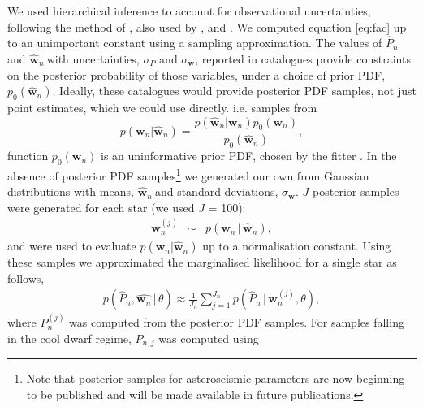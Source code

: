 \documentclass[11pt,preprint]{aastex}
\newcommand{\logg}{log \emph{g}}
\newcommand{\teff}{$T_{\rm{eff}}$}
\newcommand{\w}{\mathbf{w}}
\newcommand{\wh}{$\hat{\mathbf{w}}_n$}
\newcommand{\ph}{$\hat{P}_n$}
\newcommand{\feh}{[Fe/H]}
\begin{document}
We used hierarchical inference to account for observational uncertainties,
following the method of \citet{Hogg2010}, also used by
\citet{Foreman-Mackey2014}, \citet{Rogers2014} and \citet{Morton2014}.
We computed equation \ref{eq:fac} up to an unimportant constant
using a sampling approximation.
The values of \ph$~$and \wh$~$with uncertainties, $\sigma_P$ and
$\sigma_{\mathbf{w}}$, reported in catalogues provide constraints on the
posterior probability of those variables, under a choice of prior PDF,
$p_0(\hat{\mathbf{w}}_n)$.
Ideally, these catalogues would provide posterior PDF samples, not just point
estimates, which we could use directly.
i.e. samples from
\begin{equation}
	p(\mathbf{w}_n|\hat{\mathbf{w}}_n) =
	\frac{p(\hat{\mathbf{w}}_n|\mathbf{w}_n)p_0(\mathbf{w}_n)}
	{p_0(\hat{\mathbf{w}}_n)},
\end{equation}
function $p_0(\mathbf{w}_n)$ is an uninformative prior PDF, chosen by the
fitter \citep[][used a flat prior PDF in age and \logg]{Chaplin2014}.
In the absence of posterior PDF samples\footnote{ Note that posterior samples
for asteroseismic parameters are now beginning to be published and will be made
available in future publications.} we generated our own from Gaussian
distributions with means, \wh$~$and standard deviations, $\sigma_{\mathbf{w}}$.
$J$ posterior samples were generated for each star (we used $J$ = 100):
\begin{eqnarray}
\w_n^{(j)} &\sim& p(\w_n\,|\,\hat{\w}_n),
\end{eqnarray}
and were used to evaluate $p(\mathbf{w}_n|\hat{\mathbf{w}}_n)$ up to a
normalisation constant.
Using these samples we approximated the marginalised likelihood for a single
star as follows,
\begin{align}
	p(\hat{P}_n,\hat{\w_n}\,|\,\theta) \approx \frac{1}{J_n}
	\sum_{j=1}^{J_n}p(\hat{P}_n\,|\,\mathbf{w}_n^{(j)},\theta),
\end{align}
where $P_n^{(j)}$ was computed from the posterior PDF samples.
For samples falling in the cool dwarf regime, $P_{n,j}$ was computed using
\end{document}
